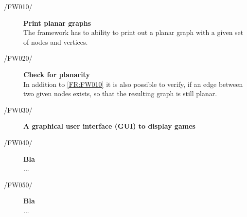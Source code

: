 \begin{description}
  	\item[/FW010/\label{FR:FW010}] {\bf Print planar graphs}  \hfill \\
  	The framework has to ability to print out a planar graph with a given set of nodes and vertices.
 	\item[/FW020/\label{FR:FW020}] {\bf Check for planarity}  \\
 	In addition to \ref{FR:FW010} it is also possible to verify, if an edge between two given nodes exists, so that the resulting graph is still planar.
	\item[/FW030/\label{FR:FW030}] {\bf A graphical user interface (GUI) to display games}  \\
  	
	\item[/FW040/\label{FR:FW040}] {\bf Bla}  \\
	...
	\item[/FW050/\label{FR:FW050}] {\bf Bla}  \\
	...
	\begin{comment}
	\item[/FW060/\label{FR:FW060}] {\bf Bla}  \\
	...
	\item[/FW070/\label{FR:FW070}] {\bf Bla}  \\
	...
	\item[/FW080/\label{FR:FW080}] {\bf Bla}  \\
	...
	\item[/FW090/\label{FR:FW090}] {\bf Bla}  \\
	...
	\item[/FW100/\label{FR:FW100}] {\bf Bla}  \\
	...
	\item[/FW110/\label{FR:FW110}] {\bf Bla}  \\
	...
	\item[/FW120/\label{FR:FW120}] {\bf Bla}  \\
	...
	\item[/FW130/\label{FR:FW130}] {\bf Bla}  \\
	...
	\item[/FW140/\label{FR:FW140}] {\bf Bla}  \\
	...
	\item[/FW150/\label{FR:FW150}] {\bf Bla}  \hfill \\
	...
	\end{comment}
\end{description}

